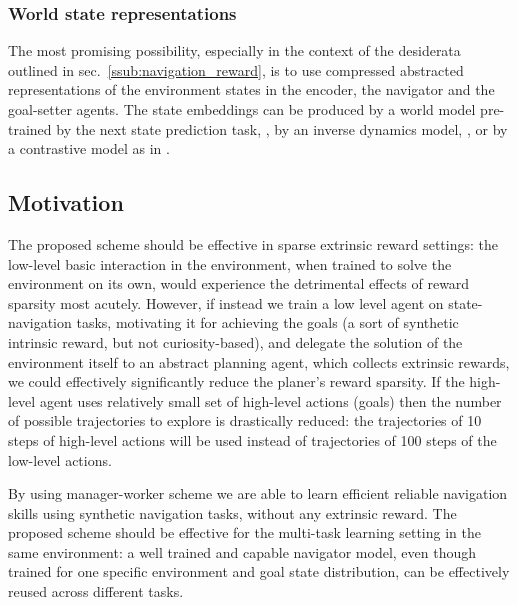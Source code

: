 \documentclass[acmsmall, nonacm]{acmart}
\begin{document}

\subsubsection{World state representations}

The most promising possibility, especially in the context of the desiderata outlined in sec.~\ref{ssub:navigation_reward}, is to use compressed abstracted representations of the environment states in the encoder, the navigator and the goal-setter agents. The state embeddings can be produced by a world model pre-trained by the next state prediction task, \citep{ha_recurrent_2018}, by an inverse dynamics model, \citep{badia_never_2020}, or by a contrastive model as in \citep{Ugadiarov2021LongTermEI}.

\subsection{Motivation}

The proposed scheme should be effective in sparse extrinsic reward settings: the low-level basic interaction in the environment, when trained to solve the environment on its own, would experience the detrimental effects of reward sparsity most acutely. However, if instead we train a low level agent on state-navigation tasks, motivating it for achieving the goals (a sort of synthetic intrinsic reward, but not curiosity-based), and delegate the solution of the environment itself to an abstract planning agent, which collects extrinsic rewards, we could effectively significantly reduce the planer's reward sparsity. If the high-level agent uses relatively small set of high-level actions (goals) then the number of possible trajectories to explore is drastically reduced: the trajectories of 10 steps of high-level actions will be used instead of trajectories of 100 steps of the low-level actions.

By using manager-worker scheme we are able to learn efficient reliable navigation skills using synthetic navigation tasks, 
without any extrinsic reward.
%
The proposed scheme should be effective for the multi-task learning setting in the same environment: a well trained and capable navigator model, even though trained for one specific environment and goal state distribution, can be effectively reused across different tasks.
\end{document}

